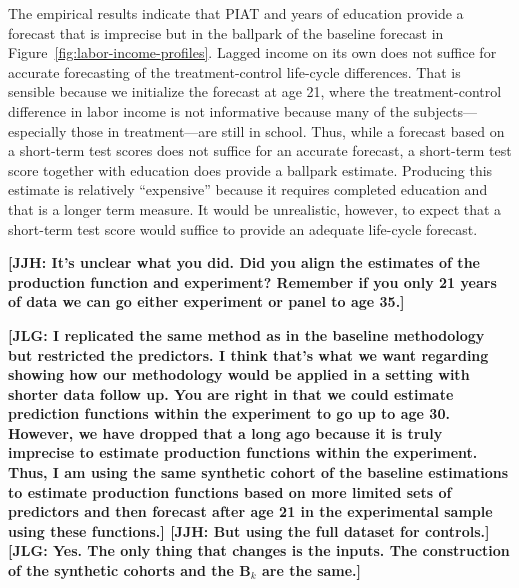 The empirical results indicate that PIAT and years of education provide a forecast that is imprecise but in the ballpark of the baseline forecast in Figure~\ref{fig:labor-income-profiles}. Lagged income on its own does not suffice for accurate forecasting of the treatment-control life-cycle differences. That is sensible because we initialize the forecast at age 21, where the treatment-control difference in labor income is not informative because many of the subjects---especially those in treatment---are still in school. Thus, while a forecast based on a short-term test scores does not suffice for an accurate forecast, a short-term test score together with education does provide a ballpark estimate. Producing this estimate is relatively ``expensive'' because it requires completed education and that is a longer term measure. It would be unrealistic, however, to expect that a short-term test score would suffice to provide an adequate life-cycle forecast. 

\noindent \textbf{[JJH: It's unclear what you did. Did you align the estimates of the production function and experiment? Remember if you only 21 years of data we can go either experiment or panel to age 35.]} 

\noindent \textbf{[JLG: I replicated the same method as in the baseline methodology but restricted the predictors. I think that's what we want regarding showing how our methodology would be applied in a setting with shorter data follow up. You are right in that we could estimate prediction functions within the experiment to go up to age 30. However, we have dropped that a long ago because it is truly imprecise to estimate production functions within the experiment. Thus, I am using the same synthetic cohort of the baseline estimations to estimate production functions based on more limited sets of predictors and then forecast after age 21 in the experimental sample using these functions.] [JJH: But using the full dataset for controls.] [JLG: Yes. The only thing that changes is the inputs. The construction of the synthetic cohorts and the $\bm{B}_k$ are the same.]}

